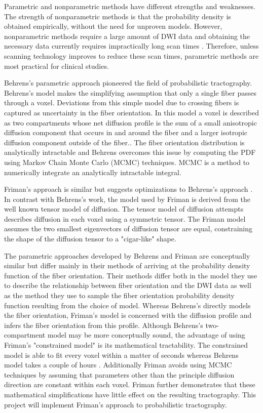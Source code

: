 Parametric and nonparametric methods have different strengths and weaknesses.  The strength of nonparametric methods is that the probability density is obtained empirically, without the need for unproven models.  However, nonparametric methods require a large amount of DWI data and obtaining the necessary data currently requires impractically long scan times \cite{derek}.  Therefore, unless scanning technology improves to reduce these scan times, parametric methods are most practical for clinical studies.

Behrens's parametric approach pioneered the field of probabilistic tractography\cite{behrensMRM03}. Behrens's model makes the simplifying assumption that only a single fiber passes through a voxel.  Deviations from this simple model due to crossing fibers is captured as uncertainty in the fiber orientation.  In this model a voxel is described as two compartments whose net diffusion profile is the sum of a small anisotropic diffusion component that occurs in and around the fiber and a larger isotropic diffusion component outside of the fiber.\cite{behrensMRM03}.  The fiber orientation distribution is analytically intractable and Behrens overcomes this issue by computing the PDF using Markov Chain Monte Carlo (MCMC) techniques.  MCMC is a method to numerically integrate an analytically intractable integral.  

Friman's approach is similar but suggests optimizations to Behrens's approach \cite{frimanTMI06}.  In contrast with Behrens's work, the model used by Friman is derived from the well known tensor model of diffusion.  The tensor model of diffusion attempts describes diffusion in each voxel using a symmetric tensor.  The Friman model assumes the two smallest eigenvectors of diffusion tensor are equal, constraining the shape of the diffusion tensor to a "cigar-like" shape. 

The parametric approaches developed by Behrens and Friman are conceptually similar but differ mainly in their methods of arriving at the probability density function of the fiber orientation.  Their methods differ both in the model they use to describe the relationship between fiber orientation and the DWI data as well as the method they use to sample the fiber orientation probability density function resulting from the choice of model.  Whereas Behrens's directly models the fiber orientation, Friman's model is concerned with the diffusion profile and infers the fiber orientation from this profile.  Although Behrens's two-compartment model may be more conceptually sound, the advantage of using Friman's "constrained model" is its mathematical tractability.  The constrained model is able to fit every voxel within a matter of seconds whereas Behrens model takes a couple of hours \cite{frimanTMI06}.  Additionally Friman avoids using MCMC techniques by assuming that parameters other than the principle diffusion direction are constant within each voxel.  Friman further demonstrates that these mathematical simplifications have little effect on the resulting tractography.  This project will implement Friman's approach to probabilistic tractography.


